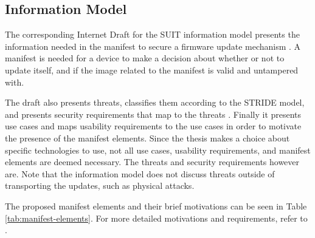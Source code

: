 \documentclass[0-thesis.tex]{subfiles}
\begin{document}
\subsection{Information Model}
\label{ssec:information-model}
The corresponding Internet Draft for the SUIT information model presents the information
needed in the manifest to secure a firmware update mechanism
\parencite{suit-information-model}. A manifest is needed for a device to make a decision
about whether or not to update itself, and if the image related to the manifest is valid
and untampered with.

The draft also presents threats, classifies them according to the STRIDE model, and
presents security requirements that map to the threats \parencite{stride}. Finally it
presents use cases and maps usability requirements to the use cases in order to motivate
the presence of the manifest elements. Since the thesis makes a choice about specific
technologies to use, not all use cases, usability requirements, and manifest elements are
deemed necessary. The threats and security requirements however are. Note that the
information model does not discuss threats outside of transporting the updates, such as
physical attacks.

The proposed manifest elements and their brief motivations can be seen in Table
\ref{tab:manifest-elements}. For more detailed motivations and requirements, refer to
\parencite{suit-information-model}.
\end{document}
